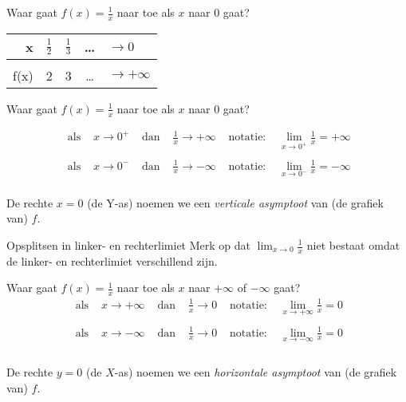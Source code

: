 \documentclass{beamer}
\begin{document}
\begin{frame}{Waar gaat $f(x)=\frac{1}{x}$ naar toe als $x$ naar $0$ gaat?}

\begin{tabular}{r|llcl}
x & $\frac{1}{2}$ & $\frac{1}{3}$ & \dots & $ \to  0$\\
\hline \\
f(x) & 2&3& \dots & $\rightarrow + \infty$
\end{tabular}
\centerline{\scalebox{.4}{}}
\end{frame}
\begin{frame}{Waar gaat $f(x)=\frac{1}{x}$ naar toe als $x$ naar $0$ gaat?}

\[\begin{array}{cccccc}
 \text{ als } &  x \to  0^+ & \text{ dan } & \frac1x \rightarrow + \infty &
 \text{ notatie: } & \displaystyle{\lim_{x \to  0^+} \frac1x = +
\infty} \\
 \\
 \text { als } & x \to
 0^- & \text{ dan } & \frac 1 x \rightarrow -\infty &
 \text{ notatie: } & \displaystyle{\lim_{x \to  0^-} \frac 1x = - \infty}\\
\end{array}
\]

De rechte $x = 0$ (de Y-as) noemen we een \textit{ verticale
asymptoot} van (de grafiek van) $f$.

\begin{alertblock}{Opsplitsen in linker- en rechterlimiet}
Merk op dat $\displaystyle{\lim_{x \to  0}} \frac 1x$ niet bestaat
omdat de linker- en rechterlimiet verschillend zijn.
\end{alertblock}
\end{frame}

\begin{frame}{Waar gaat $f(x)=\frac{1}{x}$ naar toe als $x$ naar $+ \infty$ of $- \infty$ gaat?}
\[\begin{array}{cccccc}
 \text{ als } &  x \rightarrow + \infty & \text{ dan } & \frac1x \rightarrow 0 &
 \text{ notatie: } & \displaystyle{\lim_{x \rightarrow + \infty} \frac1x = 0} \\
 \\
 \text { als } & x \rightarrow - \infty & \text{ dan } & \frac 1 x \rightarrow 0 &
 \text{ notatie: } & \displaystyle{\lim_{x \rightarrow - \infty} \frac 1x = 0}\\
\end{array}
\]
\\
De rechte $y=0$ (de $X$-as) noemen we een \textit{ horizontale
asymptoot} van (de grafiek van) $f$.
\centerline{\scalebox{.3}{}}

\end{frame}
\end{document}
